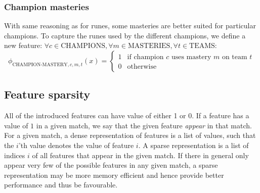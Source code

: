 \subsubsection{Champion masteries}
With same reasoning as for runes, some masteries are better suited for particular champions. To capture the runes used by the different champions, we define a new feature:
$\forall c \in \text{CHAMPIONS}, \forall m \in \text{MASTERIES}, \forall t \in \text{TEAMS}$:
\begin{equation}\label{eq:championmastery}
  \phi_{\text{CHAMPION-MASTERY},c,m,t}(x) =
\begin{cases} 
  1 & \text{if champion } c \text{ uses mastery } m \text{ on team } t\\
  0 & \text{otherwise} 
\end{cases}
\end{equation}

\subsection{Feature sparsity}\label{sec:featuresparsity}
All of the introduced features can have value of either 1 or 0. If a feature has a value of $1$ in a given match, we say that the given feature \emph{appear} in that match.
For a given match, a dense representation of features is a list of values, such that the $i$'th value denotes the value of feature $i$.
A sparse representation is a list of indices $i$ of all features that appear in the given match.
If there in general only appear very few of the possible features in any given match, a sparse representation may be more memory efficient and hence provide better performance and thus be favourable.


